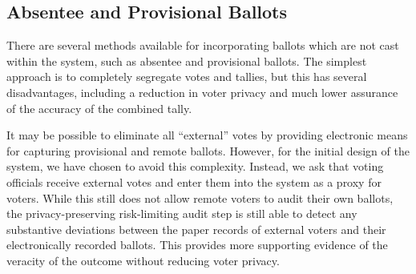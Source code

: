 \subsection{Absentee and Provisional Ballots}
There are several methods available for incorporating ballots which are not cast within the \projname system, such as absentee and provisional ballots.  The simplest approach is to completely segregate votes and tallies, but this has several disadvantages, including a reduction in voter privacy and much lower assurance of the accuracy of the combined tally.

It may be possible to eliminate all ``external'' votes by providing electronic means for capturing provisional and remote ballots.  However, for the initial design of the \projname system, we have chosen to avoid this complexity.  Instead, we ask that voting officials receive external votes and enter them into the \projname system as a proxy for voters.  While this still does not allow remote voters to audit their own ballots, the privacy-preserving risk-limiting audit step is still able to detect any substantive deviations between the paper records of external voters and their electronically recorded ballots.  This provides more supporting evidence of the veracity of the outcome without reducing voter privacy.



